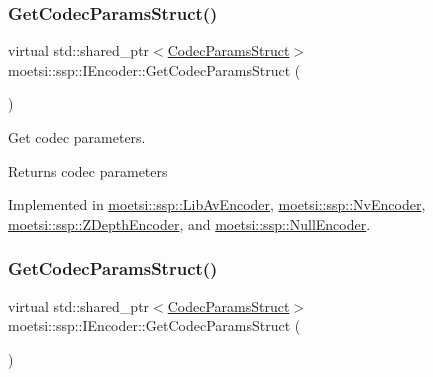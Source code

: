 \mbox{\label{classmoetsi_1_1ssp_1_1IEncoder_ad5179efaa4c74207766dd64f46f4059a}} 
\subsubsection{\texorpdfstring{Get\+Codec\+Params\+Struct()}{GetCodecParamsStruct()}\hspace{0.1cm}{\footnotesize\ttfamily [1/2]}}
{\footnotesize\ttfamily virtual std\+::shared\+\_\+ptr$<$\hyperlink{structmoetsi_1_1ssp_1_1CodecParamsStruct}{Codec\+Params\+Struct}$>$ moetsi\+::ssp\+::\+I\+Encoder\+::\+Get\+Codec\+Params\+Struct (\begin{DoxyParamCaption}{ }\end{DoxyParamCaption})\hspace{0.3cm}{\ttfamily [pure virtual]}}



Get codec parameters. 

\begin{DoxyReturn}{Returns}
codec parameters 
\end{DoxyReturn}


Implemented in \hyperlink{classmoetsi_1_1ssp_1_1LibAvEncoder_a2ff6afafbb5da48e900d34d70a46d00c}{moetsi\+::ssp\+::\+Lib\+Av\+Encoder}, \hyperlink{classmoetsi_1_1ssp_1_1NvEncoder_aa6229a43b12d2f27e27f518fc2229b61}{moetsi\+::ssp\+::\+Nv\+Encoder}, \hyperlink{classmoetsi_1_1ssp_1_1ZDepthEncoder_a3fc9f84387dba09d1deb4761031b598f}{moetsi\+::ssp\+::\+Z\+Depth\+Encoder}, and \hyperlink{classmoetsi_1_1ssp_1_1NullEncoder_a29839bd02ad42ecd9cf8e6cce707a9fe}{moetsi\+::ssp\+::\+Null\+Encoder}.

\mbox{\label{classmoetsi_1_1ssp_1_1IEncoder_ad5179efaa4c74207766dd64f46f4059a}} 
\subsubsection{\texorpdfstring{Get\+Codec\+Params\+Struct()}{GetCodecParamsStruct()}\hspace{0.1cm}{\footnotesize\ttfamily [2/2]}}
{\footnotesize\ttfamily virtual std\+::shared\+\_\+ptr$<$\hyperlink{structmoetsi_1_1ssp_1_1CodecParamsStruct}{Codec\+Params\+Struct}$>$ moetsi\+::ssp\+::\+I\+Encoder\+::\+Get\+Codec\+Params\+Struct (\begin{DoxyParamCaption}{ }\end{DoxyParamCaption})\hspace{0.3cm}{\ttfamily [pure virtual]}}



